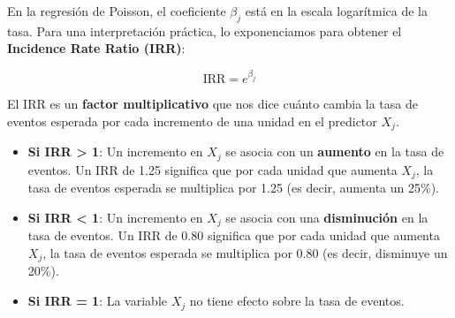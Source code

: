 \documentclass[
  letterpaper,
  DIV=11,
  numbers=noendperiod]{scrreprt}
\providecommand{\tightlist}{%
  \setlength{\itemsep}{0pt}\setlength{\parskip}{0pt}}
\begin{document}
\begin{tcolorbox}[enhanced jigsaw, leftrule=.75mm, breakable, colbacktitle=quarto-callout-important-color!10!white, bottomrule=.15mm, colframe=quarto-callout-important-color-frame, toprule=.15mm, colback=white, coltitle=black, bottomtitle=1mm, left=2mm, title=\textcolor{quarto-callout-important-color}{\faExclamation}\hspace{0.5em}{Interpretando el coeficiente de Poisson: Incidence Rate Ratio (IRR)}, opacityback=0, arc=.35mm, opacitybacktitle=0.6, toptitle=1mm, titlerule=0mm, rightrule=.15mm]

En la regresión de Poisson, el coeficiente \(\beta_j\) está en la escala
logarítmica de la tasa. Para una interpretación práctica, lo
exponenciamos para obtener el \textbf{Incidence Rate Ratio (IRR)}:

\[
\text{IRR} = e^{\beta_j}
\]

El IRR es un \textbf{factor multiplicativo} que nos dice cuánto cambia
la tasa de eventos esperada por cada incremento de una unidad en el
predictor \(X_j\).

\begin{itemize}
\tightlist
\item
  \textbf{Si IRR \textgreater{} 1}: Un incremento en \(X_j\) se asocia
  con un \textbf{aumento} en la tasa de eventos. Un IRR de 1.25
  significa que por cada unidad que aumenta \(X_j\), la tasa de eventos
  esperada se multiplica por 1.25 (es decir, aumenta un 25\%).
\item
  \textbf{Si IRR \textless{} 1}: Un incremento en \(X_j\) se asocia con
  una \textbf{disminución} en la tasa de eventos. Un IRR de 0.80
  significa que por cada unidad que aumenta \(X_j\), la tasa de eventos
  esperada se multiplica por 0.80 (es decir, disminuye un 20\%).
\item
  \textbf{Si IRR = 1}: La variable \(X_j\) no tiene efecto sobre la tasa
  de eventos.
\end{itemize}

\end{tcolorbox}
\end{document}
